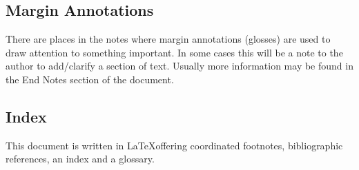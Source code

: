 \subsection{Margin Annotations}

There are places in the notes where margin annotations (glosses) are
used to draw attention to something important. In some cases this will
be a note to the author to add/clarify a section of text. Usually more
information may be found in the End Notes section of the document.

\subsection{Index}

This document is written in \LaTeX offering coordinated footnotes,
bibliographic references, an index and a glossary.

